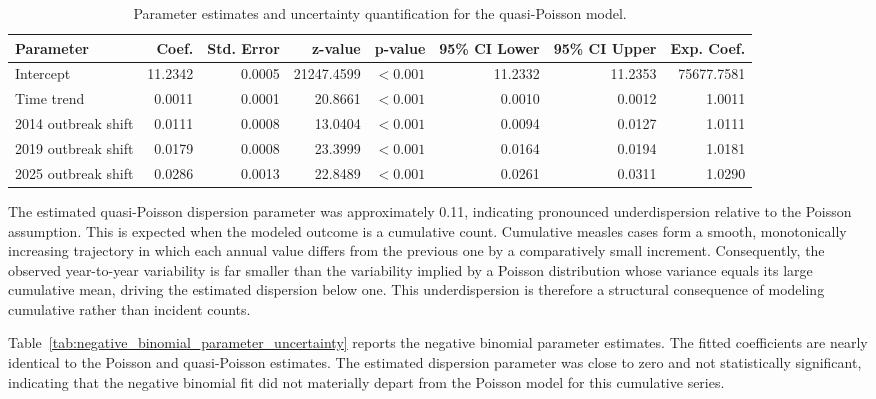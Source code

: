 \documentclass[utf8]{FrontiersinHarvard} %
\begin{document}
\begin{table}[h!]
\centering
\caption{Parameter estimates and uncertainty quantification for the quasi-Poisson model.}
\label{tab:quasi_poisson_parameter_uncertainty}
\tiny
\begin{tabular}{lrrrrrrr}
\toprule
Parameter & Coef. & Std. Error & z-value & p-value & 95\% CI Lower & 95\% CI Upper & Exp. Coef. \\
\midrule
Intercept & 11.2342 & 0.0005 & 21247.4599 & $<0.001$ & 11.2332 & 11.2353 & 75677.7581 \\
Time trend & 0.0011 & 0.0001 & 20.8661 & $<0.001$ & 0.0010 & 0.0012 & 1.0011 \\
2014 outbreak shift & 0.0111 & 0.0008 & 13.0404 & $<0.001$ & 0.0094 & 0.0127 & 1.0111 \\
2019 outbreak shift & 0.0179 & 0.0008 & 23.3999 & $<0.001$ & 0.0164 & 0.0194 & 1.0181 \\
2025 outbreak shift & 0.0286 & 0.0013 & 22.8489 & $<0.001$ & 0.0261 & 0.0311 & 1.0290 \\
\bottomrule
\end{tabular}
\end{table}

The estimated quasi-Poisson dispersion parameter was approximately 0.11, indicating pronounced underdispersion relative to the Poisson assumption. This is expected when the modeled outcome is a cumulative count. Cumulative measles cases form a smooth, monotonically increasing trajectory in which each annual value differs from the previous one by a comparatively small increment. Consequently, the observed year-to-year variability is far smaller than the variability implied by a Poisson distribution whose variance equals its large cumulative mean, driving the estimated dispersion below one. This underdispersion is therefore a structural consequence of modeling cumulative rather than incident counts.


Table~\ref{tab:negative_binomial_parameter_uncertainty} reports the negative binomial parameter estimates. The fitted coefficients are nearly identical to the Poisson and quasi-Poisson estimates. The estimated dispersion parameter was close to zero and not statistically significant, indicating that the negative binomial fit did not materially depart from the Poisson model for this cumulative series.
\end{document}
